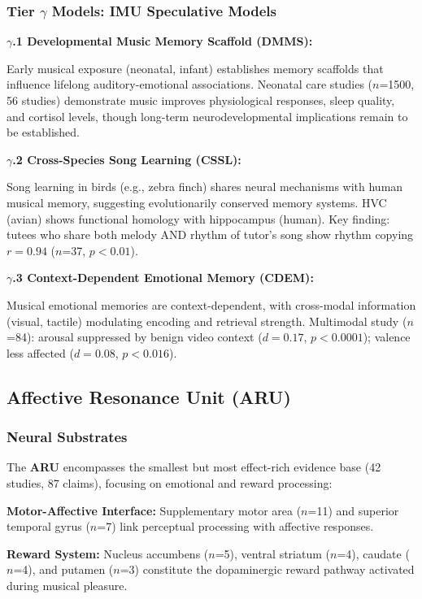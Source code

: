 \documentclass[9pt,onecolumn]{article}
\newcommand{\ARU}{\textcolor{arucolor}{\textbf{ARU}}}
\begin{document}
\subsubsection{Tier $\gamma$ Models: IMU Speculative Models}

\textbf{$\gamma$.1 Developmental Music Memory Scaffold (DMMS):}

Early musical exposure (neonatal, infant) establishes memory scaffolds that influence lifelong auditory-emotional associations. Neonatal care studies ($n$=1500, 56 studies) demonstrate music improves physiological responses, sleep quality, and cortisol levels, though long-term neurodevelopmental implications remain to be established.

\textbf{$\gamma$.2 Cross-Species Song Learning (CSSL):}

Song learning in birds (e.g., zebra finch) shares neural mechanisms with human musical memory, suggesting evolutionarily conserved memory systems. HVC (avian) shows functional homology with hippocampus (human). Key finding: tutees who share both melody AND rhythm of tutor's song show rhythm copying $r=0.94$ ($n$=37, $p<0.01$).

\textbf{$\gamma$.3 Context-Dependent Emotional Memory (CDEM):}

Musical emotional memories are context-dependent, with cross-modal information (visual, tactile) modulating encoding and retrieval strength. Multimodal study ($n$=84): arousal suppressed by benign video context ($d=0.17$, $p<0.0001$); valence less affected ($d=0.08$, $p<0.016$).

\subsection{Affective Resonance Unit (\ARU{})}

\subsubsection{Neural Substrates}

The \ARU{} encompasses the smallest but most effect-rich evidence base (42 studies, 87 claims), focusing on emotional and reward processing:

\textbf{Motor-Affective Interface:} Supplementary motor area ($n$=11) and superior temporal gyrus ($n$=7) link perceptual processing with affective responses.

\textbf{Reward System:} Nucleus accumbens ($n$=5), ventral striatum ($n$=4), caudate ($n$=4), and putamen ($n$=3) constitute the dopaminergic reward pathway activated during musical pleasure.
\end{document}
